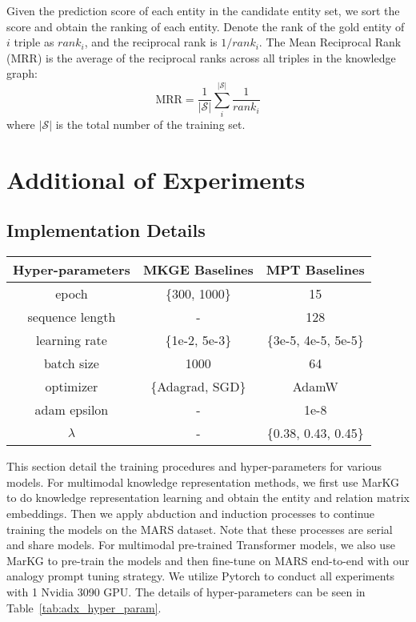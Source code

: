 \documentclass{article} \usepackage{iclr2023_conference,times}
\newcommand{\data}{MARS}
\newcommand{\kg}{MarKG}
\begin{document}
Given the prediction score of each entity in the candidate entity set, we sort the score and obtain the ranking of each entity. Denote the rank of the gold entity of $i$ triple as $rank_i$, and the reciprocal rank is $1/rank_i$. The Mean Reciprocal Rank (MRR) is the average of the reciprocal ranks across all triples in the knowledge graph:
\begin{equation}
    \text{MRR} = \frac{1}{|\mathcal{S}|} \sum\limits_{i}^{|\mathcal{S}|}\frac{1}{rank_i}
\end{equation}
where $|\mathcal{S}|$ is the total number of the training set.


\section{Additional of Experiments}
\label{adx:experiment}

\subsection{Implementation Details}

\begin{table*}[!htbp]
\small
    \centering
    \begin{tabular}{ccc}
\toprule
      Hyper-parameters & MKGE Baselines  & MPT Baselines \\
\midrule
    epoch & \{300, 1000\} & 15 \\
   sequence length & - &  128 \\
   learning rate & \{1e-2, 5e-3\} & \{3e-5, 4e-5, 5e-5\} \\
   batch size & 1000 & 64 \\
   optimizer & \{Adagrad, SGD\} & AdamW \\
   adam epsilon & - & 1e-8 \\
   $\lambda$ & - & \{0.38, 0.43, 0.45\} \\
\bottomrule
    \end{tabular}
\caption{Hyper-parameter settings. We use the same parameter settings of MKGE baseline methods as the original paper except for the learning rate. }
\label{tab:adx_hyper_param}
\end{table*}

This section detail the training procedures and hyper-parameters for various models.
For multimodal knowledge representation methods, we first use {\kg} to do knowledge representation learning and obtain the entity and relation matrix embeddings.
Then we apply abduction and induction processes to continue training the models on the {\data} dataset. Note that these processes are serial and share models.  
For multimodal pre-trained Transformer models, we also use {\kg} to pre-train the models and then fine-tune on {\data} end-to-end with our analogy prompt tuning strategy. 
We utilize Pytorch to conduct all experiments with 1 Nvidia 3090 GPU. 
The details of hyper-parameters can be seen in Table~\ref{tab:adx_hyper_param}.
\end{document}
